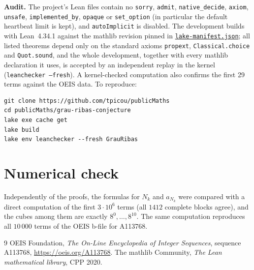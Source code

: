 \documentclass[11pt]{amsart}
\theoremstyle{remark}
\newcommand{\lean}[1]{\texttt{#1}}
\begin{document}
\smallskip
\noindent\textbf{Audit.} The project's Lean files contain no \lean{sorry}, \lean{admit},
\lean{native\_decide}, \lean{axiom}, \lean{unsafe}, \lean{implemented\_by}, \lean{opaque} or
\lean{set\_option} (in particular the default heartbeat limit is kept), and \lean{autoImplicit}
is disabled. The development builds with Lean~4.34.1 against the mathlib revision pinned in
\href{https://github.com/tpicou/publicMaths/blob/main/grau-ribas-conjecture/lake-manifest.json}{\texttt{lake-manifest.json}}; all listed theorems depend only on the standard axioms
\lean{propext}, \lean{Classical.choice} and \lean{Quot.sound}, and the whole development, together with every mathlib
declaration it uses, is accepted by an independent replay in the kernel
(\lean{leanchecker --fresh}). A kernel-checked computation also confirms the first 29 terms
against the OEIS data. To reproduce:
\begin{verbatim}
git clone https://github.com/tpicou/publicMaths
cd publicMaths/grau-ribas-conjecture
lake exe cache get
lake build
lake env leanchecker --fresh GrauRibas
\end{verbatim}

\section*{Numerical check}
Independently of the proofs, the formulas for $N_k$ and $a_{N_k}$ were compared with a direct
computation of the first $3\cdot10^6$ terms (all $1412$ complete blocks agree), and the cubes
among them are exactly $8^0,\dots,8^{10}$. The same computation reproduces all $10\,000$ terms of
the OEIS b-file for A113768.

\begin{thebibliography}{9}
 OEIS Foundation, \emph{The On-Line Encyclopedia of Integer Sequences}, sequence
A113768, \url{https://oeis.org/A113768}.
 The mathlib Community, \emph{The Lean mathematical library}, CPP 2020.
\end{thebibliography}
\end{document}
